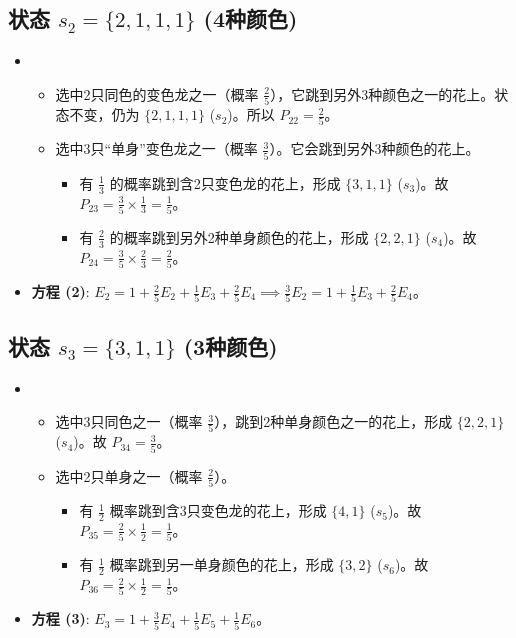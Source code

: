 \documentclass[UTF8]{ctexart}
\begin{document}
\subsection*{状态 $s_2 = \{2, 1, 1, 1\}$ (4种颜色)}
\begin{itemize}
    \item 
        \begin{itemize}
            \item 选中2只同色的变色龙之一（概率 $\frac{2}{5}$），它跳到另外3种颜色之一的花上。状态不变，仍为 $\{2,1,1,1\}$ ($s_2$)。所以 $P_{22} = \frac{2}{5}$。
            \item 选中3只“单身”变色龙之一（概率 $\frac{3}{5}$）。它会跳到另外3种颜色的花上。
                \begin{itemize}
                    \item 有 $\frac{1}{3}$ 的概率跳到含2只变色龙的花上，形成 $\{3,1,1\}$ ($s_3$)。故 $P_{23} = \frac{3}{5} \times \frac{1}{3} = \frac{1}{5}$。
                    \item 有 $\frac{2}{3}$ 的概率跳到另外2种单身颜色的花上，形成 $\{2,2,1\}$ ($s_4$)。故 $P_{24} = \frac{3}{5} \times \frac{2}{3} = \frac{2}{5}$。
                \end{itemize}
        \end{itemize}
    \item \textbf{方程 (2)}: $E_2 = 1 + \frac{2}{5}E_2 + \frac{1}{5}E_3 + \frac{2}{5}E_4 \implies \frac{3}{5}E_2 = 1 + \frac{1}{5}E_3 + \frac{2}{5}E_4$。
\end{itemize}

\subsection*{状态 $s_3 = \{3, 1, 1\}$ (3种颜色)}
\begin{itemize}
    \item 
        \begin{itemize}
            \item 选中3只同色之一（概率 $\frac{3}{5}$），跳到2种单身颜色之一的花上，形成 $\{2,2,1\}$ ($s_4$)。故 $P_{34} = \frac{3}{5}$。
            \item 选中2只单身之一（概率 $\frac{2}{5}$）。
                \begin{itemize}
                    \item 有 $\frac{1}{2}$ 概率跳到含3只变色龙的花上，形成 $\{4,1\}$ ($s_5$)。故 $P_{35} = \frac{2}{5} \times \frac{1}{2} = \frac{1}{5}$。
                    \item 有 $\frac{1}{2}$ 概率跳到另一单身颜色的花上，形成 $\{3,2\}$ ($s_6$)。故 $P_{36} = \frac{2}{5} \times \frac{1}{2} = \frac{1}{5}$。
                \end{itemize}
        \end{itemize}
    \item \textbf{方程 (3)}: $E_3 = 1 + \frac{3}{5}E_4 + \frac{1}{5}E_5 + \frac{1}{5}E_6$。
\end{itemize}
\end{document}
